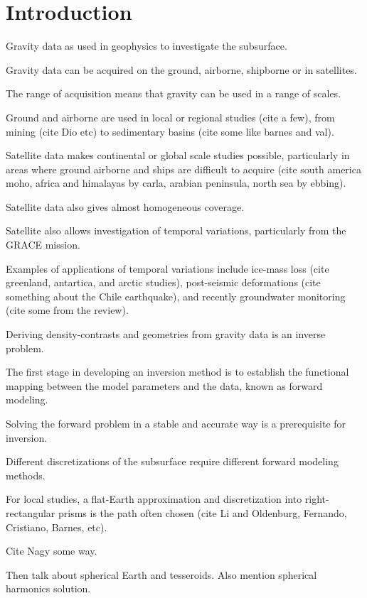 \chapter{Introduction}


Gravity data as used in geophysics to investigate the subsurface.

Gravity data can be acquired on the ground, airborne, shipborne or in satellites.

The range of acquisition means that gravity can be used in a range of scales.

Ground and airborne are used in local or regional studies (cite a few), from
mining (cite Dio etc) to sedimentary basins (cite some like barnes and val).

Satellite data makes continental or global scale studies possible, particularly
in areas where ground airborne and ships are difficult to acquire (cite south
america moho, africa and himalayas by carla, arabian peninsula, north sea
by ebbing).

Satellite data also gives almost homogeneous coverage.

Satellite also allows investigation of temporal variations, particularly from
the GRACE mission.

Examples of applications of temporal variations include ice-mass loss (cite
greenland, antartica, and arctic studies), post-seismic deformations (cite
something about the Chile earthquake), and recently groundwater monitoring
(cite some from the review).




Deriving density-contrasts and geometries from gravity data is an inverse
problem.

The first stage in developing an inversion method is to establish the
functional mapping between the model parameters and the data, known as forward
modeling.

Solving the forward problem in a stable and accurate way is a prerequisite for
inversion.

Different discretizations of the subsurface require different forward modeling
methods.

For local studies, a flat-Earth approximation and discretization into
right-rectangular prisms is the path often chosen (cite Li and Oldenburg,
Fernando, Cristiano, Barnes, etc).

Cite Nagy some way.

Then talk about spherical Earth and tesseroids. Also mention spherical
harmonics solution.
